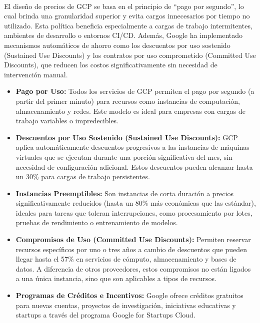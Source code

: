 {                \paragraph{}El diseño de precios de GCP se basa en el principio de “pago por segundo”, lo cual brinda una granularidad superior y evita cargos innecesarios por tiempo no utilizado. Esta política beneficia especialmente a cargas de trabajo intermitentes, ambientes de desarrollo o entornos CI/CD. Además, Google ha implementado mecanismos automáticos de ahorro como los descuentos por uso sostenido (Sustained Use Discounts) y los contratos por uso comprometido (Committed Use Discounts), que reducen los costos significativamente sin necesidad de intervención manual.
                
                \begin{itemize}
                    \item \textbf{Pago por Uso:} Todos los servicios de GCP permiten el pago por segundo (a partir del primer minuto) para recursos como instancias de computación, almacenamiento y redes. Este modelo es ideal para empresas con cargas de trabajo variables o impredecibles.
                    \item \textbf{Descuentos por Uso Sostenido (Sustained Use Discounts):} GCP aplica automáticamente descuentos progresivos a las instancias de máquinas virtuales que se ejecutan durante una porción significativa del mes, sin necesidad de configuración adicional. Estos descuentos pueden alcanzar hasta un 30\% para cargas de trabajo persistentes.
                    \item \textbf{Instancias Preemptibles:} Son instancias de corta duración a precios significativamente reducidos (hasta un 80\% más económicas que las estándar), ideales para tareas que toleran interrupciones, como procesamiento por lotes, pruebas de rendimiento o entrenamiento de modelos.
                    \item \textbf{Compromisos de Uso (Committed Use Discounts):} Permiten reservar recursos específicos por uno o tres años a cambio de descuentos que pueden llegar hasta el 57\% en servicios de cómputo, almacenamiento y bases de datos. A diferencia de otros proveedores, estos compromisos no están ligados a una única instancia, sino que son aplicables a tipos de recursos.
                    \item \textbf{Programas de Créditos e Incentivos:} Google ofrece créditos gratuitos para nuevas cuentas, proyectos de investigación, iniciativas educativas y startups a través del programa Google for Startups Cloud.

\end{itemize}}
